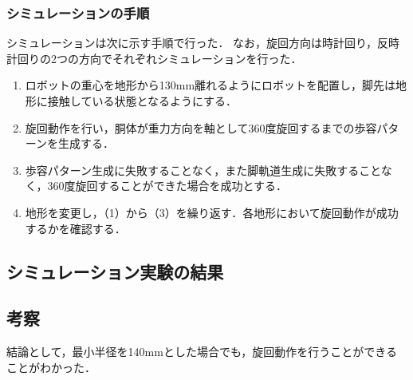 \subsubsection{シミュレーションの手順}
シミュレーションは次に示す手順で行った．
なお，旋回方向は時計回り，反時計回りの2つの方向でそれぞれシミュレーションを行った．
\begin{enumerate}
  \item ロボットの重心を地形から130mm離れるようにロボットを配置し，脚先は地形に接触している状態となるようにする．
  \item 旋回動作を行い，胴体が重力方向を軸として360度旋回するまでの歩容パターンを生成する．
  \item 歩容パターン生成に失敗することなく，また脚軌道生成に失敗することなく，360度旋回することができた場合を成功とする．
  \item 地形を変更し，（1）から（3）を繰り返す．各地形において旋回動作が成功するかを確認する．
\end{enumerate}



\subsection{シミュレーション実験の結果}

\subsection{考察}

結論として，最小半径を140mmとした場合でも，旋回動作を行うことができることがわかった．